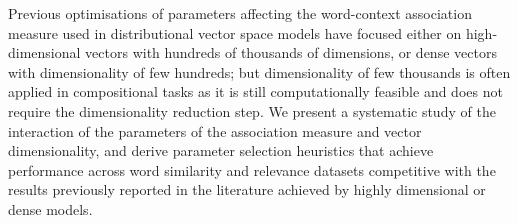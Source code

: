 Previous optimisations of parameters affecting the word-context association measure used in distributional vector space models have focused either on high-dimensional vectors with hundreds of thousands of dimensions, or dense vectors with dimensionality of few hundreds; but dimensionality of few thousands is often applied in compositional tasks as it is still computationally feasible and does not require the dimensionality reduction step. We present a systematic study of the interaction of the parameters of the association measure and vector dimensionality, and derive parameter selection heuristics that achieve performance across word similarity and relevance datasets competitive with the results previously reported in the literature achieved by highly dimensional or dense models.
